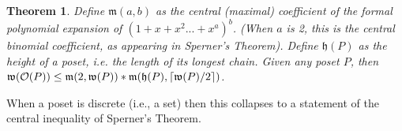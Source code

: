 \documentclass[hoptionsi,review,format=acmsmall]{acmart}
\newtheorem{theorem}{Theorem}[section]
\newtheorem{lemma}[theorem]{Lemma}
\theoremstyle{definition}
\newcommand{\Oc}{\mathcal{O}}
\newcommand{\Mf}{\mathfrak{m}}
\newcommand{\Wf}{\mathfrak{w}}
\newcommand{\Hf}{\mathfrak{h}}
\DeclarePairedDelimiter\ceil{\lceil}{\rceil}
\begin{document}
\begin{theorem}
Define \(\Mf(a,b)\) as the central (maximal) coefficient of the formal polynomial expansion of \((1 + x + x^2 ... + x^a)^b\). (When \(a\) is 2, this is the central binomial coefficient, as appearing in Sperner's Theorem). Define \(\Hf(P)\) as the height of a poset, i.e. the length of its longest chain. Given any poset \(P\), then \(\Wf(\Oc(P)) \le \Mf(2,\Wf(P)) * \Mf(\Hf(P),\ceil{\Wf(P)/2})\).
\end{theorem}

When a poset is discrete (i.e., a set) then this collapses to a statement of the central inequality of Sperner's Theorem.










\end{document}
